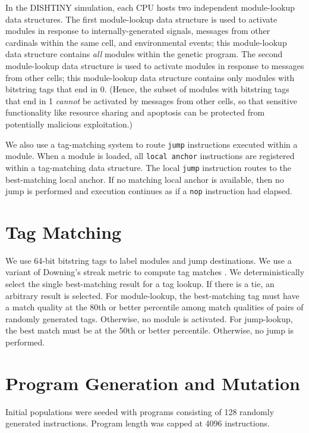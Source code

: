 In the DISHTINY simulation, each CPU hosts two independent module-lookup data structures.
The first module-lookup data structure is used to activate modules in response to internally-generated signals, messages from other cardinals within the same cell, and environmental events;
this module-lookup data structure contains \textit{all} modules within the genetic program.
The second module-lookup data structure is used to activate modules in response to messages from other cells;
this module-lookup data structure contains only modules with bitstring tags that end in 0.
(Hence, the subset of modules with bitstring tags that end in 1 \textit{cannot} be activated by messages from other cells, so that sensitive functionality like resource sharing and apoptosis can be protected from potentially malicious exploitation.)

We also use a tag-matching system to route \texttt{jump} instructions executed within a module.
When a module is loaded, all \texttt{local anchor} instructions are registered within a tag-matching data structure.
The local \texttt{jump} instruction routes to the best-matching local anchor.
If no matching local anchor is available, then no jump is performed and execution continues as if a \texttt{nop} instruction had elapsed.

\section{Tag Matching}

We use 64-bit bitstring tags to label modules and jump destinations.
We use a variant of Downing's streak metric to compute tag matches \citep{downing2015intelligence}.
We deterministically select the single best-matching result for a tag lookup.
If there is a tie, an arbitrary result is selected.
For module-lookup, the best-matching tag must have a match quality at the 80th or better percentile among match qualities of pairs of randomly generated tags.
Otherwise, no module is activated.
For jump-lookup, the best match must be at the 50th or better percentile.
Otherwise, no jump is performed.

\section{Program Generation and Mutation}

Initial populations were seeded with programs consisting of 128 randomly generated instructions.
Program length was capped at 4096 instructions.

